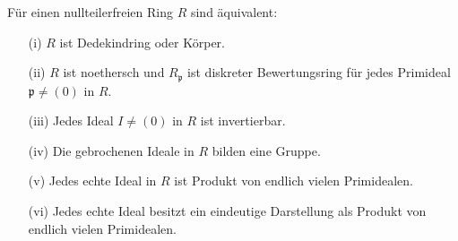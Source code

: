 \documentclass[a4paper, 10pt]{report}
\begin{document}
\begin{Satz}\label{Satz13}
F\"ur einen nullteilerfreien Ring $R$ sind \"aquivalent:

\begin{enumerate}
\item[(i)] $R$ ist Dedekindring oder K\"orper.

\item[(ii)] $R$ ist noethersch und $R_\mathfrak{p}$ ist diskreter Bewertungsring f\"ur jedes Primideal $\mathfrak{p} \neq (0)$ in $R$.

\item[(iii)] Jedes Ideal $I \neq (0)$ in $R$ ist invertierbar.

\item[(iv)] Die gebrochenen Ideale in $R$ bilden eine Gruppe.

\item[(v)] Jedes echte Ideal in $R$ ist Produkt von endlich vielen Primidealen.

\item[(vi)] Jedes echte Ideal besitzt ein eindeutige Darstellung als Produkt von endlich vielen Primidealen.
\end{enumerate}

\end{Satz}
\end{document}
